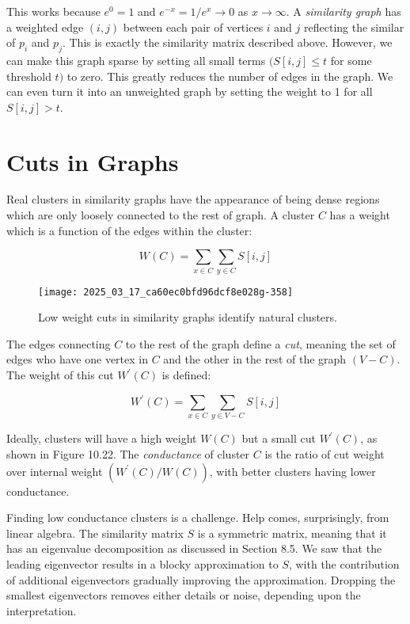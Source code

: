 \documentclass[10pt]{article}
\begin{document}
This works because $e^{0}=1$ and $e^{-x}=1/e^{x} \rightarrow 0$ as $x \rightarrow \infty$. A \emph{similarity graph} has a weighted edge $(i, j)$ between each pair of vertices $i$ and $j$ reflecting the similar of $p_{i}$ and $p_{j}$. This is exactly the similarity matrix described above. However, we can make this graph sparse by setting all small terms $(S[i, j] \leq t$ for some threshold $t)$ to zero. This greatly reduces the number of edges in the graph. We can even turn it into an unweighted graph by setting the weight to 1 for all $S[i, j]>t$.

\section{Cuts in Graphs}

Real clusters in similarity graphs have the appearance of being dense regions which are only loosely connected to the rest of graph. A cluster $C$ has a weight which is a function of the edges within the cluster:

\[
W(C)=\sum_{x \in C} \sum_{y \in C} S[i, j]
\]

\begin{figure}[H]
    \centering
    \texttt{[image: 2025\_03\_17\_ca60ec0bfd96dcf8e028g-358]}
    \caption{Low weight cuts in similarity graphs identify natural clusters.}
\end{figure}

The edges connecting $C$ to the rest of the graph define a \emph{cut}, meaning the set of edges who have one vertex in $C$ and the other in the rest of the graph $(V-C)$. The weight of this cut $W^{\prime}(C)$ is defined:

\[
W^{\prime}(C)=\sum_{x \in C} \sum_{y \in V-C} S[i, j]
\]

Ideally, clusters will have a high weight $W(C)$ but a small cut $W^{\prime}(C)$, as shown in Figure 10.22. The \emph{conductance} of cluster $C$ is the ratio of cut weight over internal weight $\left(W^{\prime}(C) / W(C)\right)$, with better clusters having lower conductance.

Finding low conductance clusters is a challenge. Help comes, surprisingly, from linear algebra. The similarity matrix $S$ is a symmetric matrix, meaning that it has an eigenvalue decomposition as discussed in Section 8.5. We saw that the leading eigenvector results in a blocky approximation to $S$, with the contribution of additional eigenvectors gradually improving the approximation. Dropping the smallest eigenvectors removes either details or noise, depending upon the interpretation.
\end{document}
